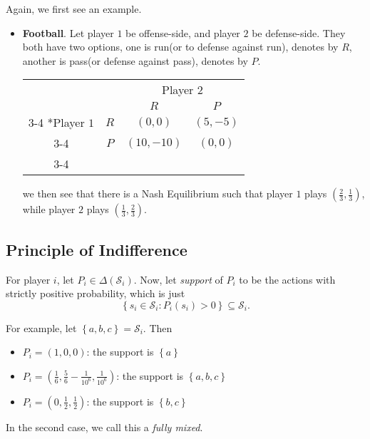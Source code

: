 \begin{eg}
	Again, we first see an example.
	\begin{itemize}
		\item \label{Football}\textbf{Football}. Let player \(1\) be offense-side, and player \(2\) be defense-side. They both have two options, one is
		      run(or to defense against run), denotes by \(R\),  another is pass(or defense against pass), denotes by \(P\).
		      \begin{table}[H]
			      \centering
			      \setlength{\extrarowheight}{2pt}
			      \begin{tabular}{cc|c|c|}
				                                & \multicolumn{1}{c}{} & \multicolumn{2}{c}{Player $2$}                           \\
				                                & \multicolumn{1}{c}{} & \multicolumn{1}{c}{$R$}        & \multicolumn{1}{c}{$P$} \\\cline{3-4}
				      \multirow{2}*{Player $1$} & $R$                  & $(0, 0)$                       & $(5, -5)$               \\\cline{3-4}
				                                & $P$                  & $(10, -10)$                    & $(0, 0)$                \\\cline{3-4}
			      \end{tabular}
		      \end{table}
		      we then see that there is a Nash Equilibrium such that player \(1\) plays \((\frac{2}{3}, \frac{1}{3})\), while player \(2\) plays
		      \((\frac{1}{3}, \frac{2}{3})\).
	\end{itemize}
\end{eg}

\subsection{Principle of Indifference}
For player \(i\), let \(P_i\in \Delta(\mathcal{S}_{i})\). Now, let \emph{support} of \(P_{i}\) to be the actions with strictly positive probability,
which is just
\[
	\left\{s_{i}\in \mathcal{S}_{i}\colon P_{i}(s_{i})>0\right\}\subseteq \mathcal{S}_{i}.
\]

\begin{eg}
	For example, let \(\left\{a, b, c\right\} = \mathcal{S}_{i}\). Then
	\begin{itemize}
		\item \(P_{i} = (1, 0, 0)\): the support is \(\left\{a\right\}\)
		\item \(P_{i} = (\frac{1}{6}, \frac{5}{6} - \frac{1}{10^6}, \frac{1}{10^6})\): the support is \(\left\{a, b, c\right\}\)
		\item \(P_{i} = (0, \frac{1}{2}, \frac{1}{2})\): the support is \(\left\{b, c\right\}\)
	\end{itemize}
	\begin{note}
		In the second case, we call this a \emph{fully mixed}.
	\end{note}
\end{eg}


